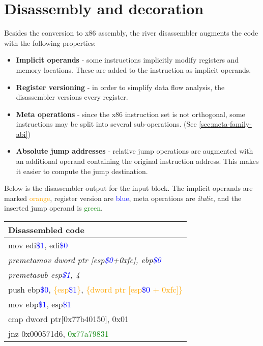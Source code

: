 \documentclass[12pt]{report}
\begin{document}
\section{Disassembly and decoration}
\label{sec:disassembly-and-decoration}
Besides the conversion to x86 assembly, the river disassembler augments the code with the following properties:
\begin{itemize}
	\item \textbf{Implicit operands} - some instructions implicitly modify registers and memory locations. These are added to the instruction as implicit operands.
	\item \textbf{Register versioning} - in order to simplify data flow analysis, the disassembler versions every register.
	\item \textbf{Meta operations} - since the x86 instruction set is not orthogonal, some instructions may be split into several sub-operations. (See \autoref{sec:meta-family-abi})
	\item \textbf{Absolute jump addresses} - relative jump operations are augmented with an additional operand containing the original instruction address. This makes it easier to compute the jump destination.
\end{itemize}

Below is the disassembler output for the input block. The implicit operands are marked \textcolor{orange}{orange}, register version are \textcolor{blue}{blue}, meta operations are \textit{italic}, and the inserted jump operand is \textcolor{green}{green}.\\
\newline
\begin{tabular}{| l |}
	\hline
	\textbf{Disassembled code}\\ \hline
	mov edi\textcolor{blue}{\$1}, edi\textcolor{blue}{\$0}\\
	\textit{premetamov dword ptr [esp\textcolor{blue}{\$0}+0xfc], ebp\textcolor{blue}{\$0}}\\
	\textit{premetasub esp\textcolor{blue}{\$1}, 4}\\
	push ebp\textcolor{blue}{\$0}, \textcolor{orange}{\{esp}\textcolor{blue}{\$1}\textcolor{orange}{\}}, \textcolor{orange}{\{dword ptr [esp}\textcolor{blue}{\$0 }\textcolor{orange}{+ 0xfc]\}}\\
	mov ebp\textcolor{blue}{\$1}, esp\textcolor{blue}{\$1}\\
	cmp dword ptr[0x77b40150], 0x01\\
	jnz 0x000571d6, \textcolor{green}{0x77a79831}\\ \hline
\end{tabular}
\end{document}
